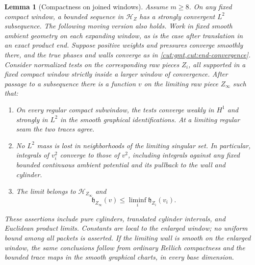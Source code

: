 \documentclass[11pt]{article}
\numberwithin{equation}{section}
\newtheorem{lemma}[theorem]{Lemma}
\theoremstyle{definition}
\theoremstyle{remark}
\begin{document}
\begin{lemma}[Compactness on joined windows]\label{shield:compactness}
Assume $m\ge8$.  On any fixed compact window, a bounded sequence in
$\mathcal H_Z$ has a strongly convergent $L^2$ subsequence.  The following
moving version also holds.  Work in fixed smooth ambient geometry on each expanding window,
as is the case after translation in an exact product end.  Suppose
positive weights and pressures converge smoothly there, and the true
phases and walls converge as in \cref{cut:gmt,cut:end-convergence}.
Consider normalized tests on the corresponding raw pieces $Z_i$, all
supported in a fixed compact window strictly inside a larger window of
convergence.  After passage to a subsequence there is a function $v$ on
the limiting raw piece $Z_\infty$ such that:
\begin{enumerate}[label=\textup{(\roman*)}]
\item On every regular compact subwindow, the tests converge weakly in
$H^1$ and strongly in $L^2$ in the smooth graphical identifications.  At
a limiting regular seam the two traces agree.
\item No $L^2$ mass is lost in neighborhoods of the limiting singular
set.  In particular, integrals of $v_i^2$ converge to those of $v^2$,
including integrals against any fixed bounded continuous ambient
potential and its pullback to the wall and cylinder.
\item The limit belongs to $\mathcal H_{Z_\infty}$ and
\begin{equation}\label{shield:liminf}
 \mathfrak h_{Z_\infty}(v)
       \le\liminf_i\mathfrak h_{Z_i}(v_i).
\end{equation}
\end{enumerate}
These assertions include pure cylinders, translated cylinder intervals,
and Euclidean product limits.  Constants are local to the enlarged
window; no uniform bound among all packets is asserted.
If the limiting wall is smooth on the enlarged window, the same
conclusions follow from ordinary Rellich compactness and the bounded
trace maps in the smooth graphical charts, in every base dimension.
\end{lemma}
\end{document}
